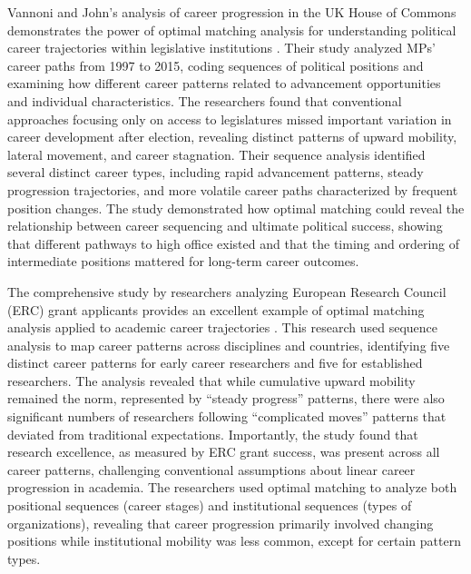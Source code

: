 \documentclass[../main.tex]{subfiles}
\begin{document}
Vannoni and John's analysis of career progression in the UK House of Commons demonstrates the power of optimal matching analysis for understanding political career trajectories within legislative institutions \parencite{vannoni_john_career_progression}. Their study analyzed MPs' career paths from 1997 to 2015, coding sequences of political positions and examining how different career patterns related to advancement opportunities and individual characteristics. The researchers found that conventional approaches focusing only on access to legislatures missed important variation in career development after election, revealing distinct patterns of upward mobility, lateral movement, and career stagnation. Their sequence analysis identified several distinct career types, including rapid advancement patterns, steady progression trajectories, and more volatile career paths characterized by frequent position changes. The study demonstrated how optimal matching could reveal the relationship between career sequencing and ultimate political success, showing that different pathways to high office existed and that the timing and ordering of intermediate positions mattered for long-term career outcomes.

The comprehensive study by researchers analyzing European Research Council (ERC) grant applicants provides an excellent example of optimal matching analysis applied to academic career trajectories \parencite{mapping_career_patterns}. This research used sequence analysis to map career patterns across disciplines and countries, identifying five distinct career patterns for early career researchers and five for established researchers. The analysis revealed that while cumulative upward mobility remained the norm, represented by ``steady progress'' patterns, there were also significant numbers of researchers following ``complicated moves'' patterns that deviated from traditional expectations. Importantly, the study found that research excellence, as measured by ERC grant success, was present across all career patterns, challenging conventional assumptions about linear career progression in academia. The researchers used optimal matching to analyze both positional sequences (career stages) and institutional sequences (types of organizations), revealing that career progression primarily involved changing positions while institutional mobility was less common, except for certain pattern types.
\end{document}
